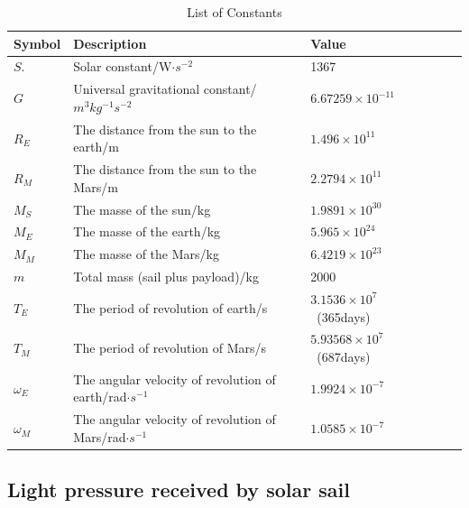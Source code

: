 \documentclass[../Paper.tex]{subfiles}
\begin{document}
\renewcommand\arraystretch{1.5} %
\begin{table}[H]
\centering
\scriptsize %
\begin{tabular}{p{2cm}<{\centering} p{6.5cm}<{\centering} p{3cm}<{\centering} %
				p{1cm}<{\centering} p{1cm}<{\centering} }
		\hline
Symbol & Description & Value \\
	    \hline
	    \hline
$S.$ & Solar constant/W$\cdot s^{-2}$ & 1367 \\

$G$ & Universal gravitational constant/$m^3kg^{-1}s^{-2}$ & $6.67259\times10^{-11}$ \\

$R_E$ & The distance from the sun to the earth/m & $1.496\times10^{11}$ \\
		
$R_M$ & The distance from the sun to the Mars/m & $2.2794\times10^{11}$ \\

$M_S$ & The masse of the sun/kg & $1.9891\times10^{30}$  \\

$M_E$ & The masse of the earth/kg & $5.965\times10^{24}$  \\

$M_M$ & The masse of the Mars/kg & $6.4219\times10^{23}$  \\

$m$ & Total mass (sail plus payload)/kg & 2000~ \\

$T_E$ & The period of revolution of earth/s & $3.1536\times10^{7}$~(365days) \\

$T_M$ & The period of revolution of Mars/s & $5.93568\times10^{7}$~(687days)\\

$\omega_E$ & The angular velocity of revolution of earth/rad$\cdot s^{-1}$ & $1.9924\times10^{-7}$ \\

$\omega_M$ & The angular velocity of revolution of Mars/rad$\cdot s^{-1}$ & $1.0585\times10^{-7}$ \\
	    \hline
\end{tabular}

\caption{List of Constants}
\label{Table1}
\end{table}  

\subsection{Light pressure received by solar sail}
\end{document}
